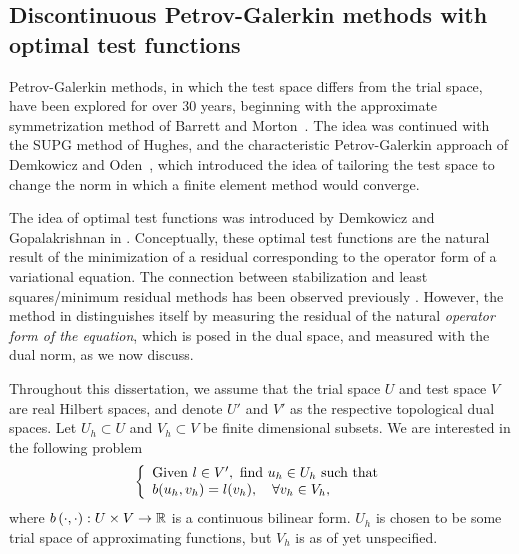 \subsection{Discontinuous Petrov-Galerkin methods with optimal test functions}
 Petrov-Galerkin methods, in which the test space
differs from the trial space, have been explored for over 30 years,
beginning with the approximate symmetrization method of Barrett and
Morton~\cite{BARRETT01101981}. The idea was continued with the SUPG
method of Hughes, and the characteristic Petrov-Galerkin approach of
Demkowicz and Oden~\cite{Demkowicz1986188}, which introduced the
idea of tailoring the test space to change the norm in which a finite
element method would converge.

The idea of optimal test functions was introduced by Demkowicz and
Gopalakrishnan in \cite{DPG2}.  Conceptually, these optimal test
functions are the natural result of the minimization of a residual
corresponding to the operator form of a variational equation. The
connection between stabilization and least squares/minimum residual
methods has been observed previously \cite{GLS}. However, the method in \cite{DPG2} distinguishes itself
by measuring the residual of the natural \textit{operator form of the equation}, which is posed in the dual space, and measured with the dual norm, as we now discuss. 	

Throughout this dissertation, we assume that the trial space $U$ and test space $V$ are real Hilbert spaces, and denote $U'$ and $V'$ as the respective topological dual spaces. Let $U_h \subset U$ and $V_h\subset V$ be finite dimensional subsets. We are interested in the following problem  
\begin{equation}
\eqnlab{variationEq}
\left\{
  \begin{array}{l}
    \text{Given } l \in V', \text{ find } u_h \in U_h  \text{ such that} \\ 
    b(u_h,v_h) = l(v_h), \quad \forall v_h\in V_h,
  \end{array}
  \right.
\end{equation}
where $b\LRp{\cdot,\cdot}: U \times V \to \mbb{R}$ is a continuous
bilinear form.  $U_h$ is chosen to be some trial space of approximating functions, but $V_h$ is as of yet unspecified. 

